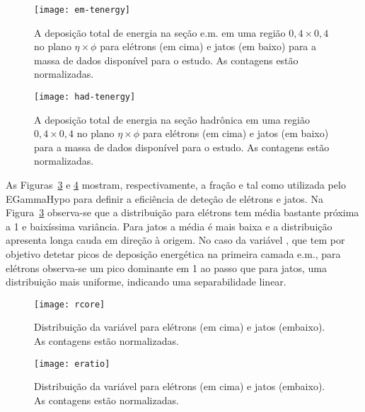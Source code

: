 \begin{figure}
\begin{center}
\texttt{[image: em-tenergy]}
\end{center}
\caption{A deposição total de energia na seção e.m. em uma região $0,4 \times
0,4$ no plano $\eta\times\phi$ para elétrons (em cima) e jatos (em baixo) para
a massa de dados disponível para o estudo. As contagens estão normalizadas.}
\label{fig:em-tenergy}
\end{figure}

\begin{figure}
\begin{center}
\texttt{[image: had-tenergy]}
\end{center}
\caption{A deposição total de energia na seção hadrônica em uma região $0,4 \times
0,4$ no plano $\eta\times\phi$ para elétrons (em cima) e jatos (em baixo) para
a massa de dados disponível para o estudo. As contagens estão normalizadas.}
\label{fig:had-tenergy}
\end{figure}

As Figuras~\ref{fig:rcore} e \ref{fig:eratio} mostram, respectivamente, a
fração \rcore e \eratio tal como utilizada pelo EGammaHypo para definir a
eficiência de deteção de elétrons e jatos. Na Figura~\ref{fig:rcore}
observa-se que a distribuição para elétrons tem média bastante próxima a 1 e
baixíssima variância. Para jatos a média é mais baixa e a distribuição
apresenta longa cauda em direção à origem. No caso da variável \eratio, que
tem por objetivo detetar picos de deposição energética na primeira camada
e.m., para elétrons observa-se um pico dominante em 1 ao passo que para jatos,
uma distribuição mais uniforme, indicando uma separabilidade linear.

\begin{figure}
\begin{center}
\texttt{[image: rcore]}
\end{center}
\caption{Distribuição da variável \rcore para elétrons (em cima) e jatos
(embaixo). As contagens estão normalizadas.}
\label{fig:rcore}
\end{figure}

\begin{figure}
\begin{center}
\texttt{[image: eratio]}
\end{center}
\caption{Distribuição da variável \eratio para elétrons (em cima) e jatos
(embaixo). As contagens estão normalizadas.}
\label{fig:eratio}
\end{figure}

